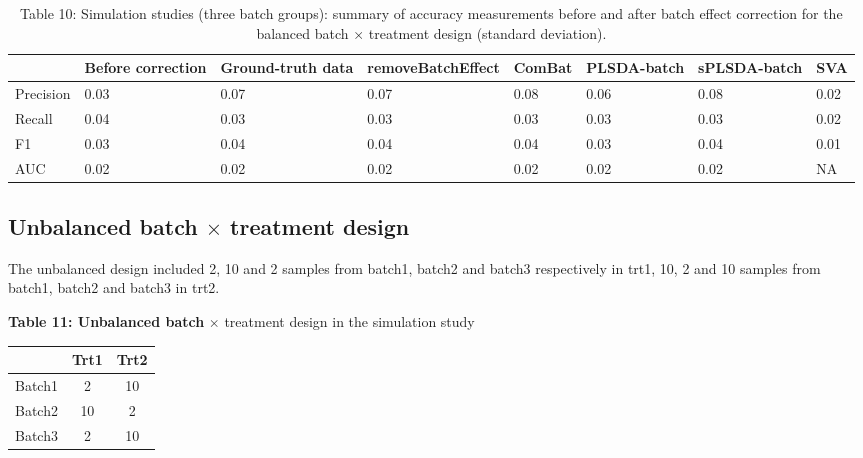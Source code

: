 \documentclass[
]{book}
\begin{document}
\begin{table}

\caption{\label{tab:unnamed-chunk-129}Table 10: Simulation studies (three batch groups): summary of accuracy measurements before and after batch effect correction for the balanced batch × treatment design (standard deviation).}
\centering
\begin{tabular}[t]{l|l|l|l|l|l|l|l}
\hline
  & Before correction & Ground-truth data & removeBatchEffect & ComBat & PLSDA-batch & sPLSDA-batch & SVA\\
\hline
Precision & 0.03 & 0.07 & 0.07 & 0.08 & 0.06 & 0.08 & 0.02\\
\hline
Recall & 0.04 & 0.03 & 0.03 & 0.03 & 0.03 & 0.03 & 0.02\\
\hline
F1 & 0.03 & 0.04 & 0.04 & 0.04 & 0.03 & 0.04 & 0.01\\
\hline
AUC & 0.02 & 0.02 & 0.02 & 0.02 & 0.02 & 0.02 & NA\\
\hline
\end{tabular}
\end{table}

\hypertarget{unbalanced-batch-times-treatment-design-2}{%
\subsection{\texorpdfstring{Unbalanced batch \(\times\) treatment design}{Unbalanced batch \textbackslash times treatment design}}\label{unbalanced-batch-times-treatment-design-2}}

The unbalanced design included 2, 10 and 2 samples from batch1, batch2 and batch3 respectively in trt1, 10, 2 and 10 samples from batch1, batch2 and batch3 in trt2.

\textbf{Table 11: Unbalanced batch} \(\times\) treatment design in the simulation study

\begin{longtable}[]{@{}ccc@{}}
\toprule()
& Trt1 & Trt2 \\
\midrule()
\endhead
Batch1 & 2 & 10 \\
Batch2 & 10 & 2 \\
Batch3 & 2 & 10 \\
\bottomrule()
\end{longtable}
\end{document}
